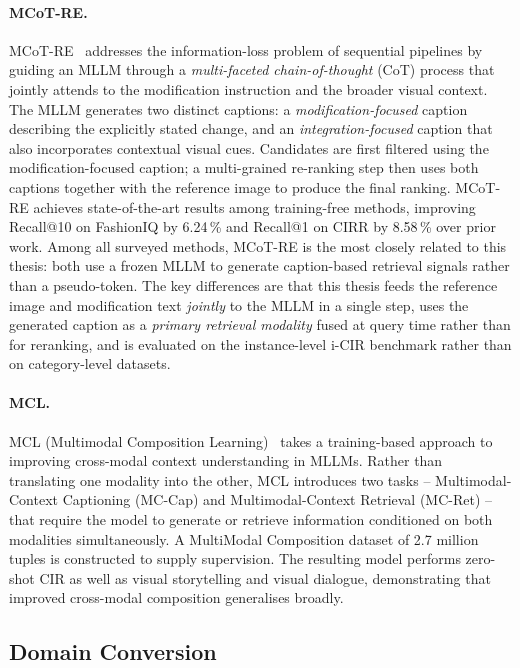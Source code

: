 \paragraph{MCoT-RE.}
MCoT-RE~\cite{park2025mcot} addresses the information-loss problem of sequential
pipelines by guiding an MLLM through a \emph{multi-faceted chain-of-thought}
(CoT) process that jointly attends to the modification instruction and the
broader visual context. The MLLM generates two distinct captions: a
\emph{modification-focused} caption describing the explicitly stated change, and
an \emph{integration-focused} caption that also incorporates contextual visual
cues. Candidates are first filtered using the modification-focused caption; a
multi-grained re-ranking step then uses both captions together with the reference
image to produce the final ranking. MCoT-RE achieves state-of-the-art results
among training-free methods, improving Recall@10 on FashionIQ by 6.24\,\% and
Recall@1 on CIRR by 8.58\,\% over prior work. Among all surveyed methods,
MCoT-RE is the most closely related to this thesis: both use a frozen MLLM to
generate caption-based retrieval signals rather than a pseudo-token. The key
differences are that this thesis feeds the reference image and modification text
\emph{jointly} to the MLLM in a single step, uses the generated caption as a
\emph{primary retrieval modality} fused at query time rather than for reranking,
and is evaluated on the instance-level i-CIR benchmark rather than on
category-level datasets.

\paragraph{MCL.}
MCL (Multimodal Composition Learning)~\cite{li2024mcl} takes a training-based
approach to improving cross-modal context understanding in MLLMs. Rather than
translating one modality into the other, MCL introduces two tasks --
Multimodal-Context Captioning (MC-Cap) and Multimodal-Context Retrieval
(MC-Ret) -- that require the model to generate or retrieve information
conditioned on both modalities simultaneously. A MultiModal Composition dataset
of 2.7 million tuples is constructed to supply supervision. The resulting model
performs zero-shot CIR as well as visual storytelling and visual dialogue,
demonstrating that improved cross-modal composition generalises broadly.

\subsection{Domain Conversion}\label{sect:rel_domain}

